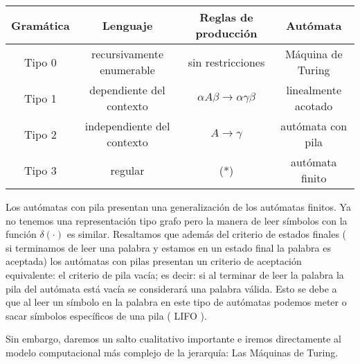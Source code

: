 \vspace{1cm}


\begin{center}
	\begin{tabular}{|c|c|c|c|}
		\hline
		Gramática & Lenguaje  &Reglas de producción   & Autómata  \\
		\hline
		Tipo 0	& recursivamente enumerable  & sin restricciones  & Máquina de Turing  \\
		\hline
		Tipo 1	& dependiente del contexto  & $\alpha A \beta \rightarrow \alpha \gamma \beta$ & linealmente acotado  \\
		\hline
		Tipo 2	& independiente del contexto  & $A \rightarrow \gamma $  & autómata con pila   \\
		\hline
		Tipo 3	& regular  & (*) & autómata finito \\
		\hline
	\end{tabular}
\end{center}

\vspace{1cm}

Los autómatas con pila presentan una generalización de los autómatas finitos. Ya no tenemos una representación tipo grafo pero la manera de leer símbolos con la función $\delta(\cdot)$ es similar. Resaltamos que además del criterio de estados finales ( si terminamos de leer una palabra y estamos en un estado final la palabra es aceptada) los autómatas con pilas presentan un criterio de aceptación equivalente: el criterio de pila vacía; es decir: si al terminar de leer la palabra la pila del autómata está vacía se considerará una palabra válida. Esto se debe a que al leer un símbolo en la palabra en este tipo de autómatas podemos meter o sacar símbolos específicos de una pila ( LIFO ).

\vspace{10px}

Sin embargo, daremos un salto cualitativo importante e iremos directamente al modelo computacional más complejo de la jerarquía: Las Máquinas de Turing.
